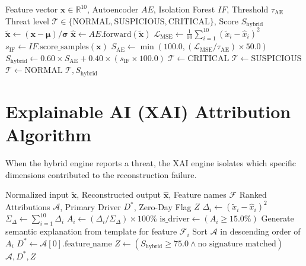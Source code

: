 \documentclass[12pt,a4paper]{report}
\begin{document}
\begin{algorithm}[htbp]
\caption{Hybrid Threat Anomaly Detection and Score Fusion}
\label{alg:hybrid_detection}
\begin{algorithmic}[1]
\Require Feature vector $\mathbf{x} \in \mathbb{R}^{10}$, Autoencoder $AE$, Isolation Forest $IF$, Threshold $\tau_{\text{AE}}$
\Ensure Threat level $\mathcal{T} \in \{\text{NORMAL}, \text{SUSPICIOUS}, \text{CRITICAL}\}$, Score $S_{\text{hybrid}}$
\State $\tilde{\mathbf{x}} \gets (\mathbf{x} - \boldsymbol{\mu}) / \boldsymbol{\sigma}$
\State $\mathbf{\hat{x}} \gets AE.\text{forward}(\tilde{\mathbf{x}})$
\State $\mathcal{L}_{\text{MSE}} \gets \frac{1}{10} \sum_{i=1}^{10} (\tilde{x}_i - \hat{x}_i)^2$
\State $s_{\text{IF}} \gets IF.\text{score\_samples}(\mathbf{x})$ 
\State $S_{\text{AE}} \gets \min(100.0, (\mathcal{L}_{\text{MSE}} / \tau_{\text{AE}}) \times 50.0)$
\State $S_{\text{hybrid}} \gets 0.60 \times S_{\text{AE}} + 0.40 \times (s_{\text{IF}} \times 100.0)$
    \State $\mathcal{T} \gets \text{CRITICAL}$
    \State $\mathcal{T} \gets \text{SUSPICIOUS}$
\Else
    \State $\mathcal{T} \gets \text{NORMAL}$
\EndIf
\State \Return $\mathcal{T}, S_{\text{hybrid}}$
\end{algorithmic}
\end{algorithm}

\section{Explainable AI (XAI) Attribution Algorithm}
When the hybrid engine reports a threat, the XAI engine isolates which specific dimensions contributed to the reconstruction failure.

\begin{algorithm}[htbp]
\caption{Dimension-Wise Reconstruction Residual Attribution (XAI)}
\label{alg:xai}
\begin{algorithmic}[1]
\Require Normalized input $\tilde{\mathbf{x}}$, Reconstructed output $\mathbf{\hat{x}}$, Feature names $\mathcal{F}$
\Ensure Ranked Attributions $\mathcal{A}$, Primary Driver $D^*$, Zero-Day Flag $Z$
    \State $\Delta_i \gets (\tilde{x}_i - \hat{x}_i)^2$ 
\EndFor
\State $\Sigma_{\Delta} \gets \sum_{i=1}^{10} \Delta_i$
    \State $A_i \gets (\Delta_i / \Sigma_{\Delta}) \times 100\%$
    \State $\text{is\_driver} \gets (A_i \ge 15.0\%)$
    \State Generate semantic explanation from template for feature $\mathcal{F}_i$
\EndFor
\State Sort $\mathcal{A}$ in descending order of $A_i$
\State $D^* \gets \mathcal{A}[0].\text{feature\_name}$
\State $Z \gets (S_{\text{hybrid}} \ge 75.0 \land \text{no signature matched})$
\State \Return $\mathcal{A}, D^*, Z$
\end{algorithmic}
\end{algorithm}
\end{document}

